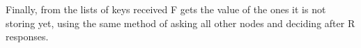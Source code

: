 \documentclass[12pt, a4paper]{article}
\begin{document}
    Finally, from the lists of keys received F gets the value of the ones it is not storing yet, using the same method of asking all other nodes and deciding after R responses.







\end{document}

